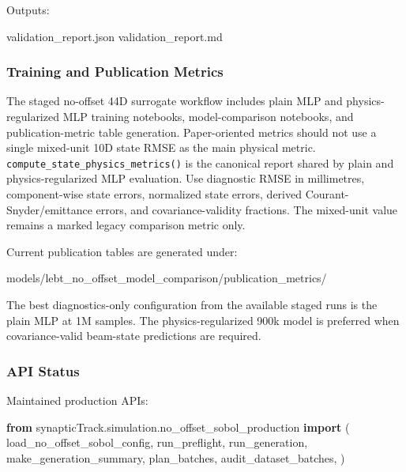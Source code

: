 \documentclass[
]{article}
\newenvironment{Shaded}{}{}
\newcommand{\ImportTok}[1]{\textcolor[rgb]{0.00,0.50,0.00}{\textbf{#1}}}
\newcommand{\NormalTok}[1]{#1}
\begin{document}
Outputs:

\begin{Shaded}
\begin{Highlighting}[]
\NormalTok{validation\_report.json}
\NormalTok{validation\_report.md}
\end{Highlighting}
\end{Shaded}

\hypertarget{training-and-publication-metrics}{%
\subsubsection{Training and Publication
Metrics}\label{training-and-publication-metrics}}

The staged no-offset 44D surrogate workflow includes plain MLP and
physics-regularized MLP training notebooks, model-comparison notebooks,
and publication-metric table generation. Paper-oriented metrics should
not use a single mixed-unit 10D state RMSE as the main physical metric.
\texttt{compute\_state\_physics\_metrics()} is the canonical report
shared by plain and physics-regularized MLP evaluation. Use diagnostic
RMSE in millimetres, component-wise state errors, normalized state
errors, derived Courant-Snyder/emittance errors, and covariance-validity
fractions. The mixed-unit value remains a marked legacy comparison
metric only.

Current publication tables are generated under:

\begin{Shaded}
\begin{Highlighting}[]
\NormalTok{models/lebt\_no\_offset\_model\_comparison/publication\_metrics/}
\end{Highlighting}
\end{Shaded}

The best diagnostics-only configuration from the available staged runs
is the plain MLP at 1M samples. The physics-regularized 900k model is
preferred when covariance-valid beam-state predictions are required.

\hypertarget{api-status}{%
\subsubsection{API Status}\label{api-status}}

Maintained production APIs:

\begin{Shaded}
\begin{Highlighting}[]
\ImportTok{from}\NormalTok{ synapticTrack.simulation.no\_offset\_sobol\_production }\ImportTok{import}\NormalTok{ (}
\NormalTok{    load\_no\_offset\_sobol\_config,}
\NormalTok{    run\_preflight,}
\NormalTok{    run\_generation,}
\NormalTok{    make\_generation\_summary,}
\NormalTok{    plan\_batches,}
\NormalTok{    audit\_dataset\_batches,}
\NormalTok{)}
\end{Highlighting}
\end{Shaded}
\end{document}
